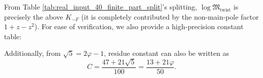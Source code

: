 \begin{remark}\label{rem:real-input-40-artin-sign-mertens-value}
From Table \ref{tab:real_input_40_finite_part_split}'s splitting, \(\log\mathfrak{M}_{\mathrm{twist}}\) is precisely the above \(K_{-F}\) (it is completely contributed by the non-main-pole factor \(1+z-z^2\)).
For ease of verification, we also provide a high-precision constant table:

\end{remark}
Additionally, from $\sqrt5=2\varphi-1$, residue constant can also be written as
\[
C=\frac{47+21\sqrt5}{100}=\frac{13+21\varphi}{50}.
\]












